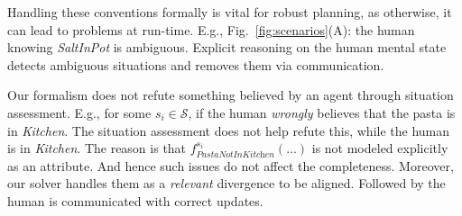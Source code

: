\documentclass[letterpaper]{article} %
\begin{document}
Handling these conventions formally is vital for robust planning, as otherwise, it can lead to problems at run-time. 
E.g., Fig.~\ref{fig:scenarios}(A): the human knowing \textit{SaltInPot} is ambiguous. 
Explicit reasoning on the human mental state detects ambiguous situations and removes them via communication. 

Our formalism does not refute something believed by an agent through situation assessment. 
E.g., for some $s_i \in \mathcal{S}$, if the human \textit{wrongly} believes that the pasta is in \textit{Kitchen}. The situation assessment does not help refute this, while the human is in \textit{Kitchen}. 
The reason is that $f_{\textit{PastaNotInKitchen}}^{s_i}(...)$ is not modeled explicitly as an attribute. 
And hence such issues do not affect the completeness. 
Moreover, our solver handles them as a \textit{relevant} divergence to be aligned. Followed by the human is communicated with correct updates.







\end{document}
